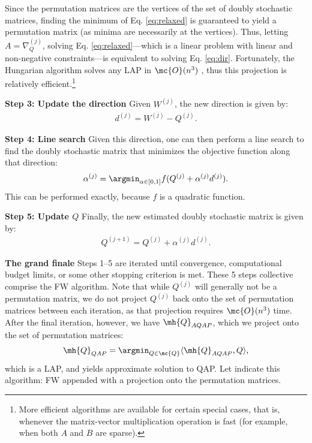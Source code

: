 \documentclass[10pt,journal,cspaper,compsoc]{IEEEtran}
\begin{document}
Since the permutation matrices are the vertices of the set of doubly stochastic matrices, finding the minimum of Eq. \eqref{eq:relaxed} is guaranteed to yield a permutation matrix (as minima are necessarily at the vertices).  Thus, letting $A=\nabla_Q^{(j)}$, solving Eq. \eqref{eq:relaxed}---which is a linear problem with linear and non-negative constraints---is equivalent to solving Eq. \eqref{eq:dir}.  Fortunately, the Hungarian algorithm solves any LAP in $\mc{O}(n^3)$ \cite{Burkard2009}, thus this projection is relatively efficient.\footnote{More efficient algorithms are available for certain special cases, that is, whenever the matrix-vector multiplication operation is fast (for example, when both $A$ and $B$ are sparse).}

\textbf{Step 3: Update the direction} Given $W^{(j)}$, the new direction is given by:
\begin{align}
	d^{(j)}=W^{(j)}-Q^{(j)}.
\end{align}


\textbf{Step 4: Line search} Given this direction, one can then perform a line search to find the doubly stochastic matrix that minimizes the objective function along that direction:
\begin{align}
	\alpha^{(j)} = \argmin_{\alpha \in [0,1]} f(Q^{(j)} + \alpha^{(j)} d^{(j)}).
\end{align}
This can be performed exactly, because $f$ is a quadratic function.  


\textbf{Step 5: Update $Q$} Finally, the new estimated doubly stochastic matrix is given by:
\begin{align}\label{eq:update}
	Q^{(j+1)} = Q^{(j)} + \alpha^{(j)} d^{(j)}.
\end{align}


\textbf{The grand finale} Steps 1--5 are iterated until convergence, computational budget limits, or some other stopping criterion is met.  These 5 steps collective comprise the FW algorithm.  Note that while $Q^{(j)}$ will generally not be a permutation matrix, we do not project $Q^{(j)}$ back onto the set of permutation matrices between each iteration, as that projection requires $\mc{O}(n^3)$ time. After the final iteration, however, we have $\mh{Q}_{AQAP}$, which we project onto the set of permutation matrices:
\begin{align} \label{eq:proj}
	\mh{Q}_{QAP} = \argmin_{Q \in \mc{Q}} \langle \mh{Q}_{AQAP}, Q \rangle,
\end{align}
which is a LAP, and yields approximate solution to QAP.  Let \qap indicate this algorithm: FW appended with a projection onto the permutation matrices.
\end{document}
